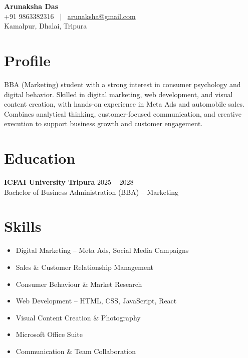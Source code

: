 \documentclass[a4paper,10pt]{article}
\begin{document}
\begin{center}
    {\LARGE \textbf{Arunaksha Das}} \\[4pt]
    +91 9863382316 \ $|$ \
    \href{mailto:arunaksha@gmail.com}{arunaksha@gmail.com} \\[2pt]
    Kamalpur, Dhalai, Tripura
\end{center}

\vspace{6pt}

\section*{Profile}

BBA (Marketing) student with a strong interest in consumer psychology and digital behavior. Skilled in digital marketing, web development, and visual content creation, with hands-on experience in Meta Ads and automobile sales. Combines analytical thinking, customer-focused communication, and creative execution to support business growth and customer engagement.

\section*{Education}

\textbf{ICFAI University Tripura} \hfill 2025 -- 2028 \\
Bachelor of Business Administration (BBA) -- Marketing

\section*{Skills}

\begin{itemize}
    \item Digital Marketing -- Meta Ads, Social Media Campaigns
    \item Sales & Customer Relationship Management
    \item Consumer Behaviour & Market Research
    \item Web Development -- HTML, CSS, JavaScript, React
    \item Visual Content Creation & Photography
    \item Microsoft Office Suite
    \item Communication & Team Collaboration
\end{itemize}
\end{document}
